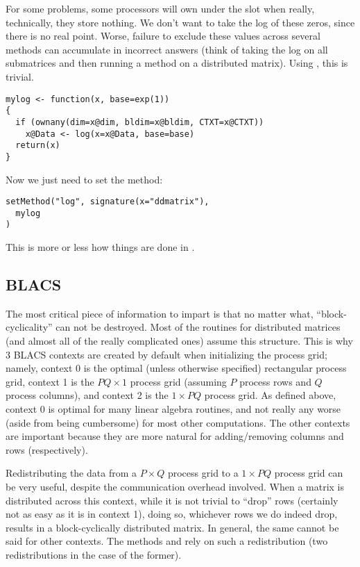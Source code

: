 For some problems, some processors will own  under the  slot when really, technically, they store nothing.  We don't want to take the log of these zeros, since there is no real point.  Worse, failure to exclude these values across several methods can accumulate in incorrect answers (think of taking the log on all submatrices and then running a  method on a distributed matrix).  Using , this is trivial.

\begin{lstlisting}[language=rr,title=Generating in Parallel]
mylog <- function(x, base=exp(1))
{
  if (ownany(dim=x@dim, bldim=x@bldim, CTXT=x@CTXT))
    x@Data <- log(x=x@Data, base=base)
  return(x)
}
\end{lstlisting}

Now we just need to set the method:

\begin{lstlisting}[language=rr,title=Generating in Parallel]
setMethod("log", signature(x="ddmatrix"),
  mylog
)

\end{lstlisting}

This is more or less how things are done in .

\subsection[]{BLACS}
\label{sec:ictxt}

The most critical piece of information to impart is that no matter what, ``block-cyclicality'' can not be destroyed.  Most of the routines for distributed matrices (and almost all of the really complicated ones) assume this structure.  This is why 3 BLACS contexts are created by default when initializing the process grid; namely, context 0 is the optimal (unless otherwise specified) rectangular process grid, context 1 is the $PQ\times 1$ process grid (assuming $P$ process rows and $Q$ process columns), and context 2 is the $1\times PQ$ process grid.  As defined above, context 0 is optimal for many linear algebra routines, and not really any worse (aside from being cumbersome) for most other computations.  The other contexts are important because they are more natural for adding/removing columns and rows (respectively).

Redistributing the data from a $P\times Q$ process grid to a $1\times PQ$ process grid can be very useful, despite the communication overhead involved.  When a matrix is distributed across this context, while it is not trivial to ``drop'' rows (certainly not as easy as it is in context 1), doing so, whichever rows we do indeed drop, results in a block-cyclically distributed matrix.  In general, the same cannot be said for other contexts.  The  methods \code{[} and  rely on such a redistribution (two redistributions in the case of the former).